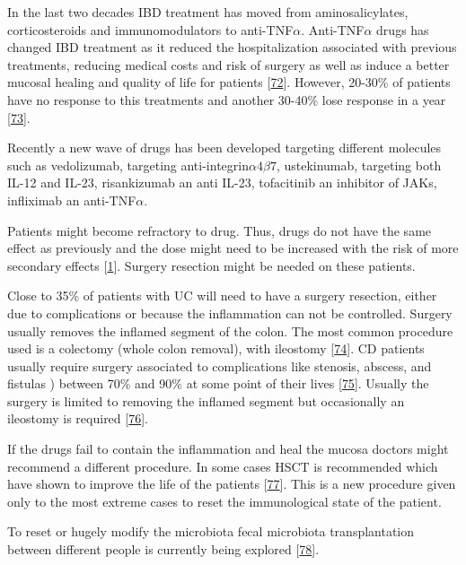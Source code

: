\documentclass[
  12pt,
  a4paper,
  twoside,
  openright]{book}
\begin{document}
In the last two decades IBD treatment has moved from aminosalicylates, corticosteroids and immunomodulators to anti-TNF\(\alpha\).
Anti-TNF\(\alpha\) drugs has changed IBD treatment as it reduced the hospitalization associated with previous treatments, reducing medical costs and risk of surgery as well as induce a better mucosal healing and quality of life for patients {[}\protect\hyperlink{ref-peyrin-biroulet2011}{72}{]}.
However, 20-30\% of patients have no response to this treatments and another 30-40\% lose response in a year {[}\protect\hyperlink{ref-billioud2011}{73}{]}.

Recently a new wave of drugs has been developed targeting different molecules such as vedolizumab, targeting anti-integrin\(\alpha 4 \beta 7\), ustekinumab, targeting both IL-12 and IL-23, risankizumab an anti IL-23, tofacitinib an inhibitor of JAKs, infliximab an anti-TNF\(\alpha\).

Patients might become refractory to drug.
Thus, drugs do not have the same effect as previously and the dose might need to be increased with the risk of more secondary effects {[}\protect\hyperlink{ref-raine2021}{1}{]}.
Surgery resection might be needed on these patients.

Close to 35\% of patients with UC will need to have a surgery resection, either due to complications or because the inflammation can not be controlled.
Surgery usually removes the inflamed segment of the colon.
The most common procedure used is a colectomy (whole colon removal), with ileostomy {[}\protect\hyperlink{ref-hwang2008}{74}{]}.
CD patients usually require surgery associated to complications like stenosis, abscess, and fistulas ) between 70\% and 90\% at some point of their lives {[}\protect\hyperlink{ref-gardiner2007}{75}{]}.
Usually the surgery is limited to removing the inflamed segment but occasionally an ileostomy is required {[}\protect\hyperlink{ref-lewis2010}{76}{]}.

If the drugs fail to contain the inflammation and heal the mucosa doctors might recommend a different procedure.
In some cases HSCT is recommended which have shown to improve the life of the patients {[}\protect\hyperlink{ref-corralizab}{77}{]}.
This is a new procedure given only to the most extreme cases to reset the immunological state of the patient.

To reset or hugely modify the microbiota fecal microbiota transplantation between different people is currently being explored {[}\protect\hyperlink{ref-weingarden2017}{78}{]}.
\end{document}
